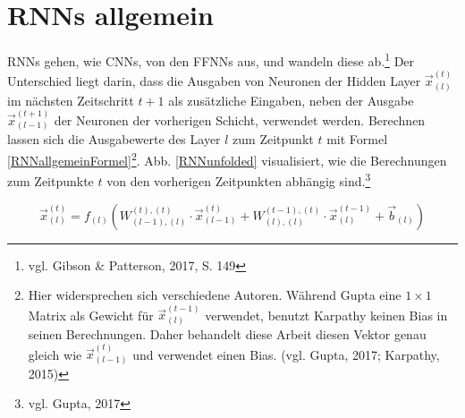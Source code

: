 \documentclass[a4paper,12pt,ngerman,oneside]{scrreprt}	%
\newcommand{\practitioner}[1]{vgl. Gibson \& Patterson, 2017, S. {#1}}
\begin{document}
	
	
		\section{RNNs allgemein}
		RNNs gehen, wie CNNs, von den FFNNs aus, und wandeln diese ab.\footnote{\practitioner{149}} Der Unterschied liegt darin, dass die Ausgaben von Neuronen der Hidden Layer $\vec{x}_{(l)}^{(t)}$ im nächsten Zeitschritt $t+1$ als zusätzliche Eingaben, neben der Ausgabe $\vec{x}_{(l-1)}^{(t+1)}$ der Neuronen der vorherigen Schicht, verwendet werden. Berechnen lassen sich die Ausgabewerte des Layer $l$ zum Zeitpunkt $t$ mit Formel \ref{RNNallgemeinFormel}\footnote{Hier widersprechen sich verschiedene Autoren. Während Gupta eine $1 \times 1$ Matrix als Gewicht für $\vec{x}_{(l)}^{(t-1)}$ verwendet, benutzt Karpathy keinen Bias in seinen Berechnungen. Daher behandelt diese Arbeit diesen Vektor genau gleich wie $\vec{x}_{(l-1)}^{(t)}$ und verwendet einen Bias. (vgl. Gupta, 2017; Karpathy, 2015)}. Abb. \ref{RNNunfolded} visualisiert, wie die Berechnungen zum Zeitpunkte $t$ von den vorherigen Zeitpunkten abhängig sind.\footnote{vgl. Gupta, 2017}

		\begin{equation}\label{RNNallgemeinFormel}
			\vec{x}_{(l)}^{(t)} = f_{(l)} ( W_{(l-1), (l)}^{(t),(t)} \cdot \vec{x}_{(l-1)}^{(t)} + W_{(l),(l)}^{(t-1),(t)} \cdot \vec{x}_{(l)}^{(t-1)} + \vec{b}_{(l)})
		\end{equation}
		 
	
			
		
\end{document}

